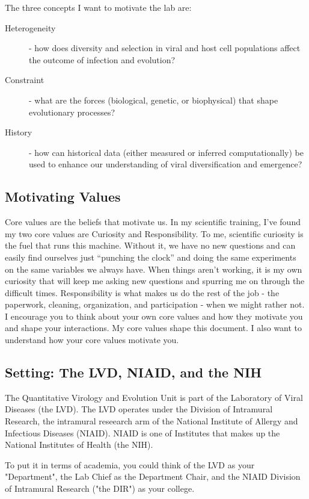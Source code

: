 \documentclass[10pt, letterpaper, twocolumn]{article} %
\begin{document}
The three concepts I want to motivate the lab are:
\begin{description}
	\item [Heterogeneity] - how does diversity and selection in viral and host cell populations affect the outcome of infection and evolution?
	\item [Constraint] - what are the forces (biological, genetic, or biophysical) that shape evolutionary processes?
	\item [History] - how can historical data (either measured or inferred computationally) be used to enhance our understanding of viral diversification and emergence?
\end{description}
\subsection{Motivating Values}
Core values are the beliefs that motivate us. In my scientific training, I’ve found my two core values are Curiosity and Responsibility. To me, scientific curiosity is the fuel that runs this machine. Without it, we have no new questions and can easily find ourselves just “punching the clock” and doing the same experiments on the same variables we always have. When things aren’t working, it is my own curiosity that will keep me asking new questions and spurring me on through the difficult times. Responsibility is what makes us do the rest of the job - the paperwork, cleaning, organization, and participation - when we might rather not. I encourage you to think about your own core values and how they motivate you and shape your interactions. My core values shape this document. I also want to understand how your core values motivate you.
\subsection{Setting: The LVD, NIAID, and the NIH}
The Quantitative Virology and Evolution Unit is part of the Laboratory of Viral Diseases (the LVD). The LVD operates under the Division of Intramural Research, the intramural reseearch arm of the National Institute of Allergy and Infectious Diseases (NIAID). NIAID is one of Institutes that makes up the National Institutes of Health (the NIH).

To put it in terms of academia, you could think of the LVD as your "Department", the Lab Chief as the Department Chair, and the NIAID Division of Intramural Research ("the DIR") as your college.
\end{document}
